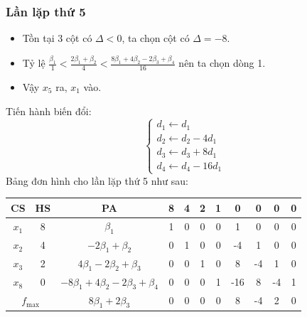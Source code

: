 \documentclass[12pt]{article}
\begin{document}
\subsubsection{Lần lặp thứ 5}
\begin{itemize}
\item Tồn tại 3 cột có $\Delta < 0$, ta chọn cột có $\Delta = -8$.
\item Tỷ lệ $\displaystyle \frac{\beta_1}{1} < \frac{2\beta_1 + \beta_2}{4} < \frac{8\beta_1 + 4\beta_2 - 2\beta_3 + \beta_4}{16}$ nên ta chọn dòng 1.
\item Vậy $x_5$ ra, $x_1$ vào.
\end{itemize}
Tiến hành biến đổi:
$$
\left\{
\begin{array}{lll}
d_1 \leftarrow d_1 \\
d_2 \leftarrow d_2 - 4d_1 \\
d_3 \leftarrow d_3 + 8d_1\\
d_4 \leftarrow d_4 - 16d_1
\end{array}
\right.
$$
Bảng đơn hình cho lần lặp thứ 5 như sau:
\begin{table}[H]
\centering
\begin{tabular}{|c|c|c|c|c|c|c|c|c|c|c|}
\hline
CS & HS & PA & 8 & 4 & 2 & 1 & 0 & 0 & 0 & 0 \\
\hline
$x_1$ & 8 & $\beta_1$ & 1 & 0 & 0 & 0 & 1 & 0 & 0 & 0 \\
$x_2$ & 4 & $-2\beta_1 + \beta_2$ & 0 & 1 & 0 & 0 & -4 & 1 & 0 & 0 \\
$x_3$ & 2 & $4\beta_1 - 2\beta_2 + \beta_3$ & 0 & 0 & 1 & 0 & 8 & -4 & 1 & 0 \\
$x_8$ & 0 & $-8\beta_1 + 4\beta_2 - 2\beta_3 + \beta_4$ & 0 & 0 & 0 & 1 & -16 & 8 & -4 & 1 \\
\hline
\multicolumn{2}{|c|}{$f_{\max}$}
& $8\beta_1 + 2\beta_3$ & 0 & 0 & 0 & 0 & 8 & -4 & 2 & 0 \\
\hline
\end{tabular}
\end{table}
\end{document}
